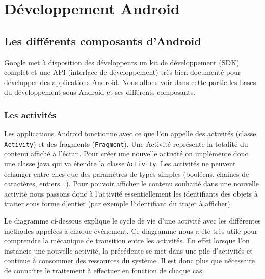 \chapter{Développement Android}
\section{Les différents composants d'Android}
Google met à disposition des développeurs un kit de développement (SDK) complet et une API (interface de développement) très bien documenté pour développer des applications Android. Nous allons voir dans cette partie les bases du développement sous Android et ses différents composants.
\subsection{Les activités}
Les applications Android fonctionne avec ce que l'on appelle des activités (classe \verb!Activity!) et des fragments (\verb!Fragment!).
Une Activité représente la totalité du contenu affiché à l'écran. Pour créer une nouvelle activité on implémente donc une classe java qui va étendre la classe \verb!Activity!. Les activités ne peuvent échanger entre elles que des paramètres de types simples (booléens, chaines de caractères, entiers...). Pour pouvoir afficher le contenu souhaité dans une nouvelle activité nous passons donc à l'activité essentiellement les identifiants des objets à traiter sous forme d'entier (par exemple l'identifiant du trajet à afficher).\bigskip

Le diagramme ci-dessous explique le cycle de vie d'une activité avec les différentes méthodes appelées à chaque événement. Ce diagramme nous a été très utile pour comprendre la mécanique de transition entre les activités. En effet lorsque l'on instancie une nouvelle activité, la précédente se met dans une pile d'activités et continue à consommer des ressources du système. Il est donc plus que nécessaire de connaître le traitement à effectuer en fonction de chaque cas.

